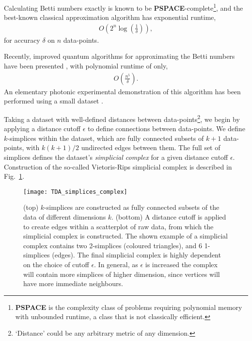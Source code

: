 Calculating Betti numbers exactly is known to be \textbf{PSPACE}-complete\footnote{\textbf{PSPACE} is the complexity class of problems requiring polynomial memory with unbounded runtime, a class that is not classically efficient.}, and the best-known classical approximation algorithm has exponential runtime,
\begin{align}
O\left(2^n \log \left(\frac{1}{\delta}\right)\right),
\end{align}
for accuracy $\delta$ on $n$ data-points.

Recently, improved quantum algorithms for approximating the Betti numbers have been presented \cite{bib:lloyd2016quantum, bib:PhysRevLett.113.130503, bib:GiovannettiLloyd08}, with polynomial runtime of only,
\begin{align}
O\left(\frac{n^5}{\delta}\right).
\end{align}
An elementary photonic experimental demonstration of this algorithm has been performed using a small dataset \cite{bib:LuRohdeTDAopt}.

Taking a dataset with well-defined distances between data-points\footnote{`Distance' could be any arbitrary metric of any dimension.}, we begin by applying a distance cutoff $\epsilon$ to define connections between data-points. We define $k$-simplices within the dataset, which are fully connected subsets of \mbox{$k+1$} data-points, with \mbox{$k(k+1)/2$} undirected edges between them. The full set of simplices defines the dataset's \textit{simplicial complex} for a given distance cutoff $\epsilon$. Construction of the so-called Vietoris-Rips simplicial complex is described in Fig.~\ref{fig:TDA_simplex}.

\begin{figure}[!htbp]
\texttt{[image: TDA\_simplices\_complex]}
\captionspacefig \caption{(top) $k$-simplices are constructed as fully connected subsets of the data of different dimensions $k$. (bottom) A distance cutoff is applied to create edges within a scatterplot of raw data, from which the simplicial complex is constructed. The shown example of a simplicial complex contains two 2-simplices (coloured triangles), and 6 1-simplices (edges). The final simplicial complex is highly dependent on the choice of cutoff $\epsilon$. In general, as $\epsilon$ is increased the complex will contain more simplices of higher dimension, since vertices will have more immediate neighbours.} \label{fig:TDA_simplex}	
\end{figure}

